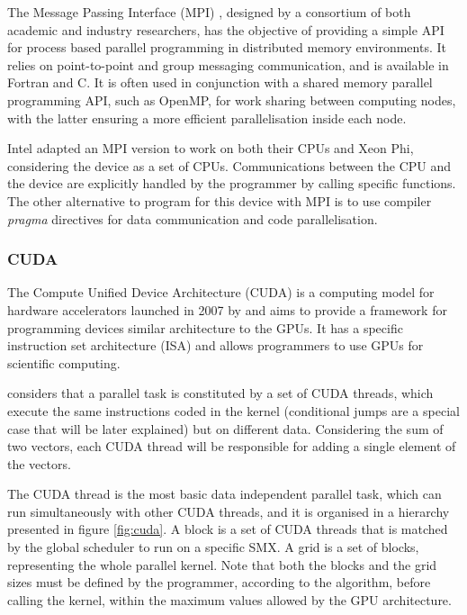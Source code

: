 The Message Passing Interface (MPI) \cite{MPI}, designed by a consortium of both academic and industry researchers, has the objective of providing a simple API for process based parallel programming in distributed memory environments. It relies on point-to-point and group messaging communication, and is available in Fortran and C. It is often used in conjunction with a shared memory parallel programming API, such as OpenMP, for work sharing between computing nodes, with the latter ensuring a more efficient parallelisation inside each node.

Intel adapted an MPI version to work on both their CPUs and Xeon Phi, considering the device as a set of CPUs. Communications between the CPU and the device are explicitly handled by the programmer by calling specific functions. The other alternative to program for this device with MPI is to use compiler \textit{pragma} directives for data communication and code parallelisation.

\subsubsection*{CUDA}

The Compute Unified Device Architecture (CUDA) is a computing model for hardware accelerators launched in 2007 by \nvidia and aims to provide a framework for programming devices similar architecture to the \nvidia GPUs. It has a specific instruction set architecture (ISA) and allows programmers to use GPUs for scientific computing.

\nvidia considers that a parallel task is constituted by a set of CUDA threads, which execute the same instructions coded in the kernel (conditional jumps are a special case that will be later explained) but on different data. Considering the sum of two vectors, each CUDA thread will be responsible for adding a single element of the vectors.

The CUDA thread is the most basic data independent parallel task, which can run simultaneously with other CUDA threads, and it is organised in a hierarchy presented in figure \ref{fig:cuda}. A block is a set of CUDA threads that is matched by the global scheduler to run on a specific SMX. A grid is a set of blocks, representing the whole parallel kernel. Note that both the blocks and the grid sizes must be defined by the programmer, according to the algorithm, before calling the kernel, within the maximum values allowed by the GPU architecture.

